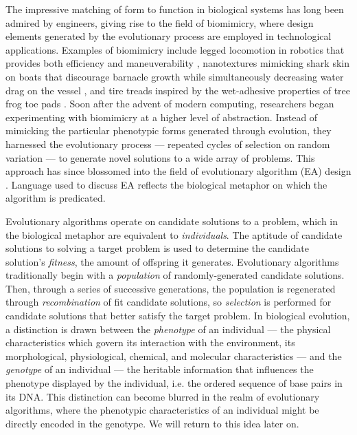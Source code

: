 
The impressive matching of form to function in biological systems has long been admired by engineers, giving rise to the field of biomimicry, where design elements generated by the evolutionary process are employed in technological applications. Examples of biomimicry include legged locomotion in robotics that provides both efficiency and maneuverability \cite{Grimes2012THE}, nanotextures mimicking shark skin on boats that discourage barnacle growth while simultaneously decreasing water drag on the vessel \cite{Stenzel2011Drag-reducingShipping}, and tire treads inspired by the wet-adhesive properties of tree frog toe pads \cite{Persson2007WetTires}. Soon after the advent of modern computing, researchers began experimenting with biomimicry at a higher level of abstraction. Instead of mimicking the particular phenotypic forms generated through evolution, they harnessed the evolutionary process --- repeated cycles of selection on random variation --- to generate novel solutions to a wide array of problems. This approach has since blossomed into the field of evolutionary algorithm (EA) design \cite{Mitchell1996AnAlgorithms}. Language used to discuss EA reflects the biological metaphor on which the algorithm is predicated.

Evolutionary algorithms operate on candidate solutions to a problem, which in the biological metaphor are equivalent to \textit{individuals}. The aptitude of candidate solutions to solving a target problem is used to determine the candidate solution's \textit{fitness}, the amount of offspring it generates. Evolutionary algorithms traditionally begin with a \textit{population} of randomly-generated candidate solutions. Then, through a series of successive generations, the population is regenerated through \textit{recombination} of fit candidate solutions, so \textit{selection} is performed for candidate solutions that better satisfy the target problem. In biological evolution, a distinction is drawn between the \textit{phenotype} of an individual --- the physical characteristics which govern its interaction with the environment, its morphological, physiological, chemical, and molecular characteristics --- and the \textit{genotype} of an individual --- the heritable information that influences the phenotype displayed by the individual, i.e. the ordered sequence of base pairs in its DNA. This distinction can become blurred in the realm of evolutionary algorithms, where the phenotypic characteristics of an individual might be directly encoded in the genotype. We will return to this idea later on.

